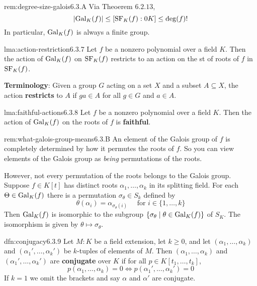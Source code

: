 \documentclass[landscape, 8pt]{extarticle}
\begin{document}
\begin{multicols}{3}
\begin{rem}{rem:degree-size-galois}{6.3.A}
    Via Theoerem $6.2.13$,
    \[\lvert \operatorname{Gal}_{K}(f) \rvert \le [\mathrm{SF}_{K}(f) :0K] \le \deg(f)!\]
    In particular, $\operatorname{Gal}_{K}(f)$ is always a finite group.
\end{rem}

\begin{lma}{lma:action-restriction}{6.3.7}
    Let $f$ be a nonzero polynomial over a field $K$. Then the action of $\operatorname{Gal}_{K}(f)$ on $\mathrm{SF}_{K}(f)$ restricts to an action on the st of roots of $f$ in $\mathrm{SF}_{K}(f)$.

    \longrule{0.08ex}
    \textbf{Terminology}: Given a group $G$ acting on a set $X$ and a subset $A \subseteq X$, the action \textbf{restricts} to $A$ if $ga \in A$ for all $g\in G$ and $a\in A$.
\end{lma}

\begin{lma}{lma:faithful-actions}{6.3.8}
    Let $f$ be a nonzero polynomial over a field $K$. Then the action of $\operatorname{Gal}_{K}(f)$ on the roots of $f$ is \textbf{faithful}.
\end{lma}

\begin{rem}{rem:what-galois-group-means}{6.3.B}
    An element of the Galois group of $f$ is completely determined by how it permutes the roots of $f$. So you can view elements of the Galois group as \textit{being} permutations of the roots.

    However, not every permutation of the roots belongs to the Galois group. Suppose $f\in K[t]$ has distinct roots $\alpha_{1},\dots,\alpha_{k}$ in its splitting field. For each $\Theta\in \operatorname{Gal}_{K}(f)$ there is a permutation $\sigma_{\theta}\in S_{k}$ defined by
    \[\theta(\alpha_{i}) = \alpha_{\sigma_{\theta}(i)} \quad\text{ for } i\in \{1,\dots,k\}\]
    Then $\operatorname{Gal}_{K}(f)$ is isomorphic to the subgroup $\{\sigma_{\theta} \mid \theta \in \operatorname{Gal}_{K}(f)\}$ of $S_{K}$. The isomorphism is given by $\theta \mapsto \sigma_{\theta}$.
\end{rem}

\begin{dfn}[Conjugacy]{dfn:conjugacy}{6.3.9}
    Let $M : K$ be a field extension, let $k \ge 0$, and let $(\alpha_{1},\dots,\alpha_{k})$ and $(\alpha_{1}',\dots,\alpha_{k}')$ be $k$-tuples of elements of $M$. Then $(\alpha_{1},\dots,\alpha_{k})$ and $(\alpha_{1}',\dots,\alpha_{k}')$ are \textbf{conjugate} over $K$ if for all $p\in K[t_{1},\dots,t_{k}]$,
    \[p(\alpha_{1},\dots,\alpha_{k})= 0 \iff p(\alpha_{1}',\dots,\alpha_{k}') = 0\]
    If $k=1$ we omit the brackets and say $\alpha$ and $\alpha'$ are conjugate.
\end{dfn}


\end{multicols}
\end{document}
